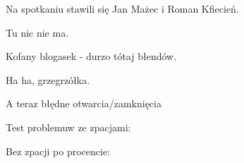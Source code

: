 \documentclass{article}
\begin{document}
Na spotkaniu stawili się Jan Mażec i Roman Kfiecień. %

Tu nic nie ma.

Kofany blogasek - durzo tótaj błendów.

Ha ha, grzegrzółka.

A teraz błędne otwarcia/zamknięcia



Test problemuw ze zpacjami: %

Bez zpacji po procencie: %
\end{document}
